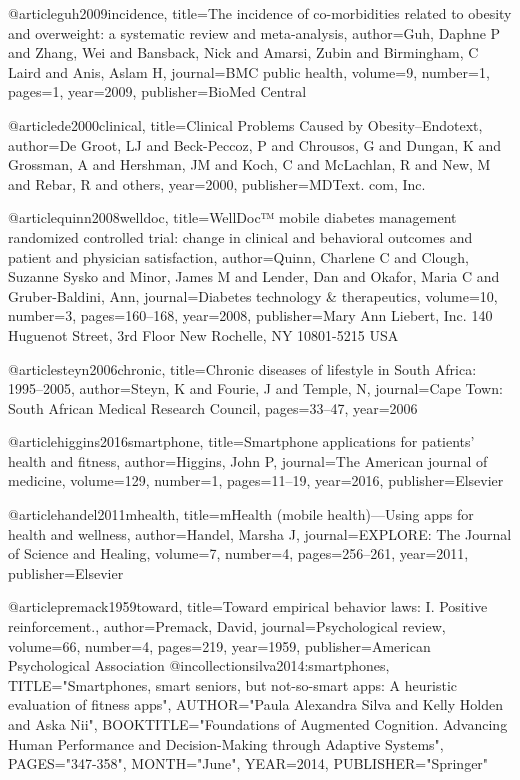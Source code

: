 @article{guh2009incidence,
  title={The incidence of co-morbidities related to obesity and overweight: a systematic review and meta-analysis},
  author={Guh, Daphne P and Zhang, Wei and Bansback, Nick and Amarsi, Zubin and Birmingham, C Laird and Anis, Aslam H},
  journal={BMC public health},
  volume={9},
  number={1},
  pages={1},
  year={2009},
  publisher={BioMed Central}
}

@article{de2000clinical,
  title={Clinical Problems Caused by Obesity--Endotext},
  author={De Groot, LJ and Beck-Peccoz, P and Chrousos, G and Dungan, K and Grossman, A and Hershman, JM and Koch, C and McLachlan, R and New, M and Rebar, R and others},
  year={2000},
  publisher={MDText. com, Inc.}
}

@article{quinn2008welldoc,
  title={WellDoc™ mobile diabetes management randomized controlled trial: change in clinical and behavioral outcomes and patient and physician satisfaction},
  author={Quinn, Charlene C and Clough, Suzanne Sysko and Minor, James M and Lender, Dan and Okafor, Maria C and Gruber-Baldini, Ann},
  journal={Diabetes technology \& therapeutics},
  volume={10},
  number={3},
  pages={160--168},
  year={2008},
  publisher={Mary Ann Liebert, Inc. 140 Huguenot Street, 3rd Floor New Rochelle, NY 10801-5215 USA}
}



@article{steyn2006chronic,
  title={Chronic diseases of lifestyle in South Africa: 1995--2005},
  author={Steyn, K and Fourie, J and Temple, N},
  journal={Cape Town: South African Medical Research Council},
  pages={33--47},
  year={2006}
}

@article{higgins2016smartphone,
  title={Smartphone applications for patients' health and fitness},
  author={Higgins, John P},
  journal={The American journal of medicine},
  volume={129},
  number={1},
  pages={11--19},
  year={2016},
  publisher={Elsevier}
}

@article{handel2011mhealth,
  title={mHealth (mobile health)—Using apps for health and wellness},
  author={Handel, Marsha J},
  journal={EXPLORE: The Journal of Science and Healing},
  volume={7},
  number={4},
  pages={256--261},
  year={2011},
  publisher={Elsevier}
}

@article{premack1959toward,
  title={Toward empirical behavior laws: I. Positive reinforcement.},
  author={Premack, David},
  journal={Psychological review},
  volume={66},
  number={4},
  pages={219},
  year={1959},
  publisher={American Psychological Association}
}
@incollection{silva2014:smartphones,
  TITLE="Smartphones, smart seniors, but not-so-smart apps: A heuristic evaluation of fitness apps",
  AUTHOR="Paula Alexandra Silva and Kelly Holden and Aska Nii",
  BOOKTITLE="Foundations of Augmented Cognition. Advancing Human Performance and Decision-Making through Adaptive Systems",
  PAGES="347-358",
  MONTH="June",
  YEAR={2014},
  PUBLISHER="Springer"
}

